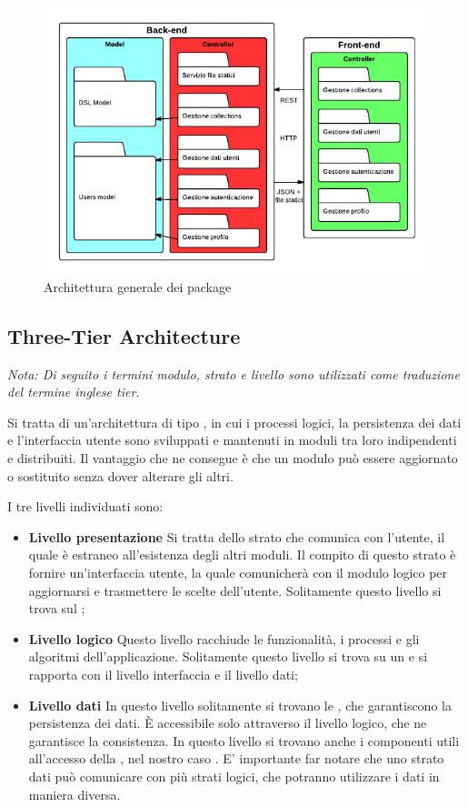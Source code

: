 \begin{figure}[H]
\centering
\includegraphics[width=\textwidth]{uml/architettura-generale-package.png}
\caption{Architettura generale dei package}
\label{architetturaGeneralePackage}
\end{figure}

\subsection{Three-Tier Architecture}

\emph{Nota: Di seguito i termini modulo, strato e livello sono utilizzati come traduzione del termine inglese tier.}
 
Si tratta di un'architettura di tipo , in cui i processi logici, la persistenza dei dati e l'interfaccia utente sono sviluppati e mantenuti in moduli tra loro indipendenti e distribuiti. Il vantaggio che ne consegue è che un modulo può essere aggiornato o sostituito senza dover alterare gli altri.

I tre livelli individuati sono:
\begin{itemize}
\item \textbf{Livello presentazione} Si tratta dello strato che comunica con l'utente, il quale è estraneo all'esistenza degli altri moduli. Il compito di questo strato è fornire un'interfaccia utente, la quale comunicherà con il modulo logico per aggiornarsi e trasmettere le scelte dell'utente. Solitamente questo livello si trova sul ;
\item \textbf{Livello logico} Questo livello racchiude le funzionalità, i processi e gli algoritmi dell'applicazione. Solitamente questo livello si trova su un  e si rapporta con il livello interfaccia e il livello dati; 
\item \textbf{Livello dati} In questo livello solitamente si trovano le , che garantiscono la persistenza dei dati. È accessibile solo attraverso il livello logico, che ne garantisce la consistenza. In questo livello si trovano anche i componenti utili all'accesso della , nel nostro caso .
E' importante far notare che uno strato dati può comunicare con più strati logici, che potranno utilizzare i dati in maniera diversa.
\end{itemize}


